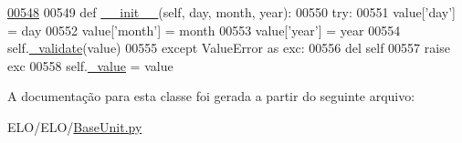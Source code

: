 \begin{DoxyCode}
\hypertarget{classELO_1_1BaseUnit_1_1Date_l00548}{}\hyperlink{classELO_1_1BaseUnit_1_1Date_a97d924fa5f1b2a1d8afbdbfe17b6a852}{00548} 
00549     \textcolor{keyword}{def }\hyperlink{classELO_1_1BaseUnit_1_1Date_a97d924fa5f1b2a1d8afbdbfe17b6a852}{\_\_init\_\_}(self, day, month, year):
00550         \textcolor{keywordflow}{try}:
00551             value[\textcolor{stringliteral}{'day'}] = day
00552             value[\textcolor{stringliteral}{'month'}] = month
00553             value[\textcolor{stringliteral}{'year'}] = year
00554             self.\hyperlink{classELO_1_1BaseUnit_1_1IfBaseType_a11c68b128a7069e27c1c2fcb782269ea}{\_validate}(value)
00555         \textcolor{keywordflow}{except} ValueError \textcolor{keyword}{as} exc:
00556             del self
00557             \textcolor{keywordflow}{raise} exc
00558         self.\hyperlink{classELO_1_1BaseUnit_1_1IfBaseType_ad05d9d377fc4b99743c022cc8f6019d7}{\_value} = value

\end{DoxyCode}


A documentação para esta classe foi gerada a partir do seguinte arquivo\-:\begin{DoxyCompactItemize}
\item 
E\-L\-O/\-E\-L\-O/\hyperlink{BaseUnit_8py}{Base\-Unit.\-py}\end{DoxyCompactItemize}
